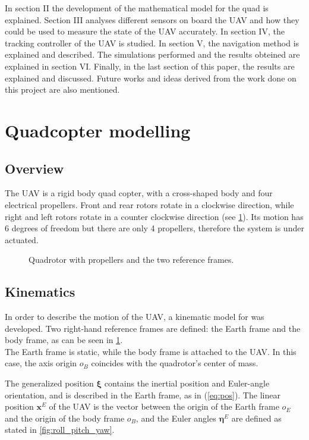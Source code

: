 \documentclass[journal]{IEEEtran}
\begin{document}
	In section II the development of the mathematical model for the quad is explained. Section III analyses different sensors on board the UAV and how they could be used to measure the state of the UAV accurately. In section IV, the tracking controller of the UAV is studied. In section V, the navigation method  is explained and described. The simulations performed and the results obteined are explained in section VI. Finally, in the last section of this paper, the results are explained and discussed. Future works and ideas derived from the work done on this project are also mentioned.

	\hfill 	
	
	
	\section{Quadcopter modelling}
	\subsection{Overview}
	
	The UAV is a rigid body quad copter, with a cross-shaped body and four electrical propellers. Front and rear rotors rotate in a clockwise direction, while right and left rotors rotate in a counter clockwise direction (see \figurename  \ref{fig:frames_rotors}). Its motion has 6 degrees of freedom but there are only 4 propellers, therefore the system is under actuated. 
	
	\begin{figure}[h]
		\centering
		
		\caption{Quadrotor with propellers and the two reference frames.}
		\label{fig:frames_rotors}
	\end{figure}
	
	\subsection{Kinematics}
	In order to describe the motion of the UAV, a kinematic model for was developed.
	Two right-hand reference frames are defined: the Earth frame and the body frame, as can be seen in \figurename{ {}\ref{fig:frames_rotors}}. \\

	The Earth frame is static, while the body frame is attached to the UAV. In this case, the axis origin $o_B$ coincides with the quadrotor's center of mass.

	The generalized position $\bm{\xi}$ contains the inertial position and Euler-angle orientation, and is described in the Earth frame, as in (\ref{eq:pos}). The linear position $\bm{x}^E$ of the UAV is the vector between the origin of the Earth frame $o_E$ and the origin of the body frame $o_B$, and the Euler angles $\bm{\eta}^E$ are defined as stated in \figurename{ \ref{fig:roll_pitch_yaw}}.
	
\end{document}
